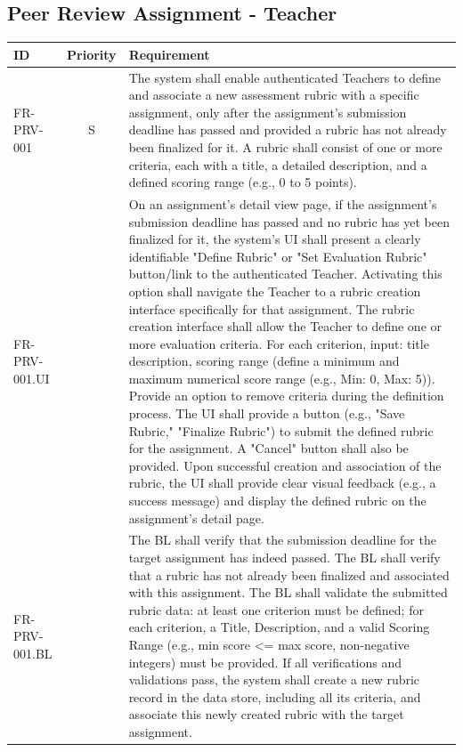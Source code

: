 \subsection{Peer Review Assignment - Teacher}
    \begin{tabular}{|l|c|p{10cm}|}
         \hline
        \textbf{ID} & \textbf{Priority} & \textbf{Requirement} \\
        \hline
        FR-PRV-001 & S & The system shall enable authenticated Teachers to define and associate a new assessment rubric with a specific assignment, only after the assignment's submission deadline has passed and provided a rubric has not already been finalized for it. A rubric shall consist of one or more criteria, each with a title, a detailed description, and a defined scoring range (e.g., 0 to 5 points). \\
        \quad FR-PRV-001.UI &  & \quad On an assignment's detail view page, if the assignment's submission deadline has passed and no rubric has yet been finalized for it, the system's UI shall present a clearly identifiable "Define Rubric" or "Set Evaluation Rubric" button/link to the authenticated Teacher. Activating this option shall navigate the Teacher to a rubric creation interface specifically for that assignment. The rubric creation interface shall allow the Teacher to define one or more evaluation criteria. For each criterion, input: title description, scoring range (define a minimum and maximum numerical score range (e.g., Min: 0, Max: 5)). Provide an option to remove criteria during the definition process. The UI shall provide a button (e.g., "Save Rubric," "Finalize Rubric") to submit the defined rubric for the assignment. A "Cancel" button shall also be provided. Upon successful creation and association of the rubric, the UI shall provide clear visual feedback (e.g., a success message) and display the defined rubric on the assignment's detail page. \\
        \quad FR-PRV-001.BL &  & \quad The BL shall verify that the submission deadline for the target assignment has indeed passed. The BL shall verify that a rubric has not already been finalized and associated with this assignment. The BL shall validate the submitted rubric data: at least one criterion must be defined; for each criterion, a Title, Description, and a valid Scoring Range (e.g., min score <= max score, non-negative integers) must be provided. If all verifications and validations pass, the system shall create a new rubric record in the data store, including all its criteria, and associate this newly created rubric with the target assignment. \\
        \hline
    \end{tabular}
